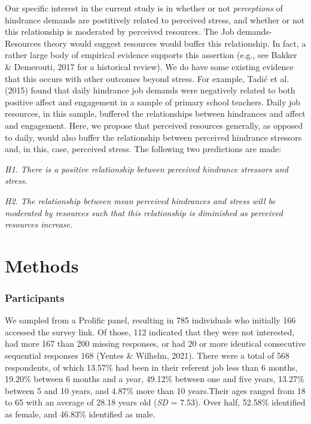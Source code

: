 \documentclass[
  man]{apa6}
\begin{document}
Our specific interest in the current study is in whether or not \emph{perceptions} of hindrance demands are postitively related to perceived stress, and whether or not this relationship is moderated by perceived resources. The Job demands-Resources theory would suggest resources would buffer this relationship. In fact, a rather large body of empirical evidence supports this assertion (e.g., see Bakker \& Demerouti, 2017 for a historical review). We do have some existing evidence that this occurs with other outcomes beyond stress. For example, Tadić et al. (2015) found that daily hindrance job demands were negatively related to both positive affect and engagement in a sample of primary school teachers. Daily job resources, in this sample, buffered the relationships between hindrances and affect and engagement. Here, we propose that perceived resources generally, as opposed to daily, would also buffer the relationship between perceived hindrance stressors and, in this, case, perceived stress. The following two predictions are made:

\emph{H1. There is a positive relationship between perceived hindrance stressors and stress.}

\emph{H2. The relationship between mean perceived hindrances and stress will be moderated by resources such that this relationship is diminished as perceived resources increase.}

\hypertarget{methods}{%
\section{Methods}\label{methods}}

\hypertarget{participants}{%
\subsubsection{Participants}\label{participants}}

We sampled from a Prolific panel, resulting in 785 individuals who initially 166 accessed the survey link. Of those, 112 indicated that they were not interested, had more 167 than 200 missing responses, or had 20 or more identical consecutive sequential responses 168 (Yentes \& Wilhelm, 2021). There were a total of 568 respondents, of which 13.57\% had been in their referent job less than 6 months, 19.20\% between 6 months and a year, 49.12\% between one and five years, 13.27\% between 5 and 10 years, and 4.87\% more than 10 years.Their ages ranged from 18 to 65 with an average of 28.18 years old (\emph{SD} = 7.53). Over half, 52.58\% identified as female, and 46.83\% identified as male.
\end{document}
